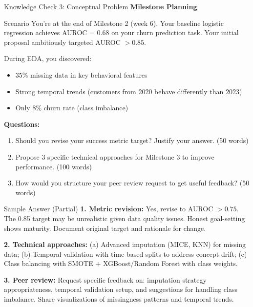 \begin{frame}{Knowledge Check 3: Conceptual Problem}
\textbf{Milestone Planning}

\vspace{0.3cm}

\begin{block}{Scenario}
You're at the end of Milestone 2 (week 6). Your baseline logistic regression achieves AUROC = 0.68 on your churn prediction task. Your initial proposal ambitiously targeted AUROC $> 0.85$.

During EDA, you discovered:
\begin{itemize}
\item 35\% missing data in key behavioral features
\item Strong temporal trends (customers from 2020 behave differently than 2023)
\item Only 8\% churn rate (class imbalance)
\end{itemize}

\textbf{Questions:}
\begin{enumerate}
\item Should you revise your success metric target? Justify your answer. (50 words)
\item Propose 3 specific technical approaches for Milestone 3 to improve performance. (100 words)
\item How would you structure your peer review request to get useful feedback? (50 words)
\end{enumerate}
\end{block}

\pause

\vspace{0.2cm}

\begin{block}{Sample Answer (Partial)}
\small
\textbf{1. Metric revision:} Yes, revise to AUROC $> 0.75$. The 0.85 target may be unrealistic given data quality issues. Honest goal-setting shows maturity. Document original target and rationale for change.

\textbf{2. Technical approaches:} (a) Advanced imputation (MICE, KNN) for missing data; (b) Temporal validation with time-based splits to address concept drift; (c) Class balancing with SMOTE + XGBoost/Random Forest with class weights.

\textbf{3. Peer review:} Request specific feedback on: imputation strategy appropriateness, temporal validation setup, and suggestions for handling class imbalance. Share visualizations of missingness patterns and temporal trends.
\end{block}
\end{frame}

